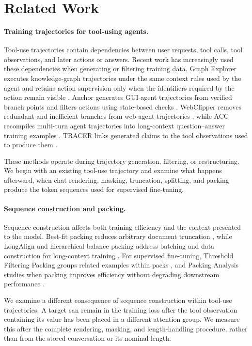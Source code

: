 \documentclass[pdflatex,sn-basic,Numbered]{sn-jnl}
\begin{document}
\section{Related Work}

\paragraph{Training trajectories for tool-using agents.}
Tool-use trajectories contain dependencies between user requests, tool calls, tool observations,
and later actions or answers. Recent work has increasingly used these dependencies when generating
or filtering training data. Graph Explorer executes knowledge-graph trajectories under the same
context rules used by the agent and retains action supervision only when the identifiers required
by the action remain visible \citep{chen2026graphexplorer}. Anchor generates GUI-agent trajectories
from verified branch points and filters actions using state-based checks
\citep{wei2026anchor}. WebClipper removes redundant and inefficient branches from web-agent
trajectories \citep{wang2026webclipper}, while ACC recompiles multi-turn agent trajectories into
long-context question--answer training examples \citep{su2026acc}. TRACER links generated claims
to the tool observations used to produce them \citep{yu2026tracer}.

These methods operate during trajectory generation, filtering, or restructuring. We begin with an
existing tool-use trajectory and examine what happens afterward, when chat rendering, masking,
truncation, splitting, and packing produce the token sequences used for supervised fine-tuning.

\paragraph{Sequence construction and packing.}
Sequence construction affects both training efficiency and the context presented to the model.
Best-fit packing reduces arbitrary document truncation \citep{ding2024fewer}, while LongAlign and
hierarchical balance packing address batching and data construction for long-context training
\citep{bai2024longalign,yao2025hbp}. For supervised fine-tuning, Threshold Filtering Packing groups
related examples within packs \citep{dong2024tfp}, and Packing Analysis studies when packing
improves efficiency without degrading downstream performance \citep{wang2024packing}.

We examine a different consequence of sequence construction within tool-use trajectories. A target
can remain in the training loss after the tool observation containing its value has been placed in
a different attention group. We measure this after the complete rendering, masking, and
length-handling procedure, rather than from the stored conversation or its nominal length.
\end{document}
